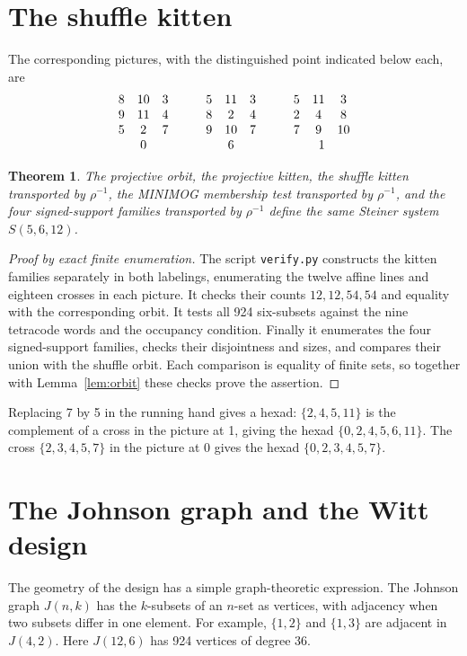 \documentclass[12pt,letterpaper]{article}
\newtheorem{theorem}{Theorem}[section]
\theoremstyle{definition}\newtheorem{example}[theorem]{Example}
\numberwithin{equation}{section}
\begin{document}
\section{The shuffle kitten}\label{sec:shuffle}
The corresponding pictures, with the distinguished point indicated below each, are
\[
\begin{array}{c@{\qquad}c@{\qquad}c}
\begin{array}{ccc}8&10&3\\9&11&4\\5&2&7\end{array}&
\begin{array}{ccc}5&11&3\\8&2&4\\9&10&7\end{array}&
\begin{array}{ccc}5&11&3\\2&4&8\\7&9&10\end{array}\\0&6&1
\end{array}
\]
\begin{theorem}\label{lem:minimog}
The projective orbit, the projective kitten, the shuffle kitten transported by $\rho^{-1}$, the MINIMOG membership test transported by $\rho^{-1}$, and the four signed-support families transported by $\rho^{-1}$ define the same Steiner system $S(5,6,12)$.
\end{theorem}
\begin{proof}[Proof by exact finite enumeration]
The script \texttt{verify.py} constructs the kitten families separately in both labelings, enumerating the twelve affine lines and eighteen crosses in each picture. It checks their counts $12,12,54,54$ and equality with the corresponding orbit. It tests all 924 six-subsets against the nine tetracode words and the occupancy condition. Finally it enumerates the four signed-support families, checks their disjointness and sizes, and compares their union with the shuffle orbit. Each comparison is equality of finite sets, so together with Lemma~\ref{lem:orbit} these checks prove the assertion.
\end{proof}

Replacing 7 by 5 in the running hand gives a hexad: $\{2,4,5,11\}$ is the complement of a cross in the picture at 1, giving the hexad $\{0,2,4,5,6,11\}$. The cross $\{2,3,4,5,7\}$ in the picture at 0 gives the hexad $\{0,2,3,4,5,7\}$.

\section{The Johnson graph and the Witt design}\label{sec:graph}
The geometry of the design has a simple graph-theoretic expression. The Johnson graph $J(n,k)$ has the $k$-subsets of an $n$-set as vertices, with adjacency when two subsets differ in one element. For example, $\{1,2\}$ and $\{1,3\}$ are adjacent in $J(4,2)$. Here $J(12,6)$ has 924 vertices of degree 36.
\end{document}
